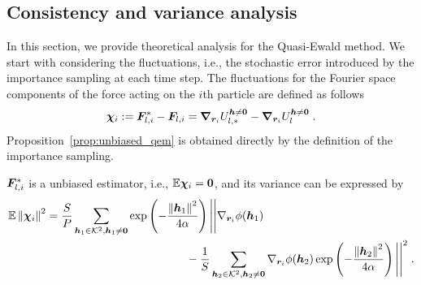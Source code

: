 \subsection{Consistency and variance analysis}
In this section, we provide theoretical analysis for the Quasi-Ewald method. We start with considering the fluctuations, i.e., the stochastic error introduced by the importance sampling at each time step.
The fluctuations for the Fourier space components of   the force acting on the $i$th particle are defined as follows 
\begin{equation}\label{eq::xichi_qem}
    \boldsymbol{\chi}_{i} :=\bm{F}_{l,i}^*-\bm{F}_{l,i}=\boldsymbol{\nabla}_{\boldsymbol{r}_i} U_{l,\ast}^{\boldsymbol{h}\neq \bm{0}}-\boldsymbol{\nabla}_{\boldsymbol{r}_i} U_{l}^{\boldsymbol{h}\neq \bm{0}}\;.
\end{equation}
Proposition~\ref{prop:unbiased_qem} is obtained directly by the definition of the importance sampling.
\begin{prop}\label{prop:unbiased_qem}
	  $\bm{F}_{l,i}^*$ is a  unbiased estimator, i.e.,  $\mathbb{E} \boldsymbol{\chi}_{i} = \bm 0$, and its variance  can be expressed by
\begin{align*}
		\mathbb{E}\left\lVert\boldsymbol{\chi}_{i}\right\rVert^2&=\frac{S}{P}\sum_{\bm{h}_1\in\mathcal{K}^2, \bm{h}_1\neq \bm{0}}\exp\left(-\frac{\left\lVert\boldsymbol{h}_1\right\rVert^2}{4\alpha}\right)\Bigg|\Bigg|\nabla_{\bm{r}_i}\phi(\boldsymbol{h}_1)\\
        &~~~~~~~~~~~~~~~~~~~~~~~~~~~~~~~~~~~~~-\frac{1}{S} \sum_{\bm{h}_2\in\mathcal{K}^2, \bm{h}_2\neq \bm{0}}\nabla_{\bm{r}_i}\phi(\boldsymbol{h}_2)\exp\left(-\frac{\left\lVert\boldsymbol{h}_2\right\rVert^2}{4\alpha}\right)\Bigg|\Bigg|^2\;.
\end{align*}
\end{prop}
